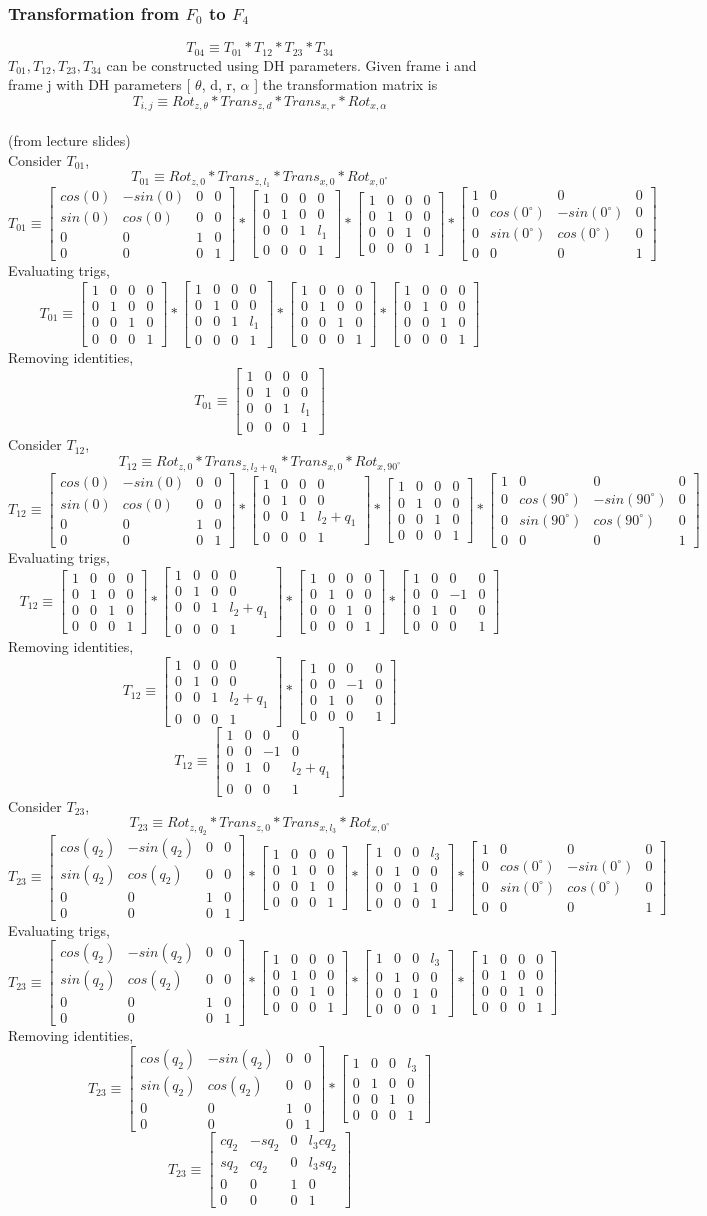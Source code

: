 \documentclass[12pt]{article}
\newcommand{\fromlectures}{{\\ \color{blue} \hspace*{\fill}(from lecture slides)} \\}
\newcommand{\rx}[1]{\begin{bmatrix} 1 & 0 & 0 & 0 \\ 0 & cos(#1) & -sin(#1) & 0 \\ 0 & sin(#1) & cos(#1) & 0 \\ 0 & 0 & 0 & 1 \end{bmatrix}}
\newcommand{\rz}[1]{\begin{bmatrix} cos(#1) & -sin(#1) & 0 & 0 \\ sin(#1) & cos(#1) & 0 & 0 \\ 0 & 0 & 1 & 0 \\ 0 & 0 & 0 & 1 \end{bmatrix}}
\newcommand{\iden}{\begin{bmatrix} 1 & 0 & 0 & 0 \\ 0 & 1 & 0 & 0 \\ 0 & 0 & 1 & 0 \\ 0 & 0 & 0 & 1 \end{bmatrix}}
\newcommand{\trans}[3]{\begin{bmatrix} 1 & 0 & 0 & #1 \\ 0 & 1 & 0 & #2 \\ 0 & 0 & 1 & #3 \\ 0 & 0 & 0 & 1 \end{bmatrix}}
\begin{document}
\subsubsection*{Transformation from $F_0$ to $F_4$}
\[
  T_{04} \equiv T_{01} * T_{12} * T_{23} * T_{34}
\]
$T_{01}, T_{12}, T_{23}, T_{34}$ can be constructed using DH parameters.
Given frame i and frame j with DH parameters [ $\theta$, d, r, $\alpha$ ] the transformation matrix is
\[
  T_{i,j} \equiv Rot_{z,\theta} * Trans_{z, d} * Trans_{x, r} * Rot_{x, \alpha}
\]
\fromlectures
Consider $T_{01}$,
\[
  T_{01} \equiv Rot_{z, 0} * Trans_{z, l_1} * Trans_{x, 0} * Rot_{x, 0^{\circ}}
\]
\[
  T_{01} \equiv \rz{0} * \trans{0}{0}{l_1} * \trans{0}{0}{0} * \rx{0^{\circ}}
\]
Evaluating trigs,
\[
  T_{01} \equiv \iden * \trans{0}{0}{l_1} * \trans{0}{0}{0} * \iden
\]
Removing identities,
\[
  T_{01} \equiv \trans{0}{0}{l_1}
\]
Consider $T_{12}$,
\[
  T_{12} \equiv Rot_{z, 0} * Trans_{z, l_2 + q_1} * Trans_{x, 0} * Rot_{x, 90^{\circ}}
\]
\[
  T_{12} \equiv \rz{0} * \trans{0}{0}{l_2 + q_1} * \trans{0}{0}{0} * \rx{90^{\circ}}
\]
Evaluating trigs,
\[
  T_{12} \equiv \iden * \trans{0}{0}{l_2 + q_1} * \trans{0}{0}{0}
  * \begin{bmatrix} 1 & 0 & 0 & 0 \\ 0 & 0 & -1 & 0 \\ 0 & 1 & 0 & 0 \\ 0 & 0 & 0 & 1 \end{bmatrix}
\]
Removing identities,
\[
  T_{12} \equiv \trans{0}{0}{l_2 + q_1}
  * \begin{bmatrix} 1 & 0 & 0 & 0 \\ 0 & 0 & -1 & 0 \\ 0 & 1 & 0 & 0 \\ 0 & 0 & 0 & 1 \end{bmatrix}
\]
\[
  T_{12} \equiv
  \begin{bmatrix} 1 & 0 & 0 & 0 \\ 0 & 0 & -1 & 0 \\ 0 & 1 & 0 & l_2 + q_1 \\ 0 & 0 & 0 & 1 \end{bmatrix}
\]
Consider $T_{23}$,
\[
  T_{23} \equiv Rot_{z, q_2} * Trans_{z, 0} * Trans_{x, l_3} * Rot_{x, 0^{\circ}}
\]
\[
  T_{23} \equiv \rz{q_2} * \trans{0}{0}{0} * \trans{l_3}{0}{0} * \rx{0^{\circ}}
\]
Evaluating trigs,
\[
  T_{23} \equiv \rz{q_2} * \trans{0}{0}{0} * \trans{l_3}{0}{0} * \iden
\]
Removing identities,
\[
  T_{23} \equiv \rz{q_2} * \trans{l_3}{0}{0}
\]
\[
  T_{23} \equiv
  \begin{bmatrix} cq_2 & -sq_2 & 0 & l_3cq_2 \\ sq_2 & cq_2 & 0 & l_3sq_2 \\ 0 & 0 & 1 & 0 \\ 0 & 0 & 0 & 1 \end{bmatrix}
\]
\end{document}

